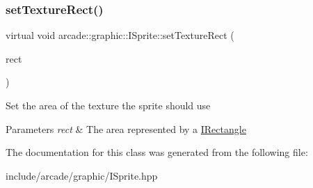 \subsubsection{\texorpdfstring{setTextureRect()}{setTextureRect()}}
{\footnotesize\ttfamily virtual void arcade\+::graphic\+::\+I\+Sprite\+::set\+Texture\+Rect (\begin{DoxyParamCaption}\item[{const \mbox{\hyperlink{classarcade_1_1graphic_1_1_i_rectangle}{I\+Rectangle}} \&}]{rect }\end{DoxyParamCaption})\hspace{0.3cm}{\ttfamily [pure virtual]}}

Set the area of the texture the sprite should use 
\begin{DoxyParams}{Parameters}
{\em rect} & The area represented by a \mbox{\hyperlink{classarcade_1_1graphic_1_1_i_rectangle}{I\+Rectangle}} \\
\hline
\end{DoxyParams}


The documentation for this class was generated from the following file\+:\begin{DoxyCompactItemize}
\item 
include/arcade/graphic/I\+Sprite.\+hpp\end{DoxyCompactItemize}
